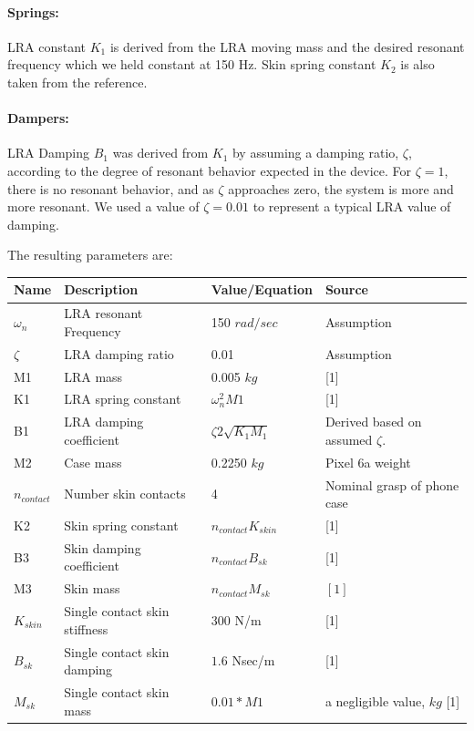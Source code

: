 \documentclass[letterpaper,11pt]{article}
\begin{document}
\paragraph{Springs:}
LRA constant $K_1$ is derived from the LRA moving mass and the desired resonant frequency
which we held constant at 150 Hz.  Skin spring constant
$K_2$ is also  taken from the reference.

\paragraph{Dampers:}
LRA Damping $B_1$ was derived from $K_1$ by assuming a damping ratio, $\zeta$, according to the degree of resonant behavior expected in the device.
For $\zeta=1$, there is no resonant behavior, and as $\zeta$ approaches zero, the system is more and more resonant.  We used a value of $\zeta=0.01$
to represent a typical LRA value of damping.

The resulting parameters are:
\begin{table}[h]
\centering
\begin{tabular}{|l|l|p{1.25in}|p{1.05in}|}\hline

\textbf{Name} & \textbf{Description} & \textbf{Value/Equation} & {\bf Source}\\
\hline
$\omega_n$   &  LRA resonant Frequency &  150  $rad/sec$ & Assumption \\\hline
$\zeta$      &  LRA damping ratio      &   0.01          & Assumption \\\hline
M1 & LRA mass & 0.005 $kg$  & [1]\\
\hline
K1 & LRA spring constant & $\omega_n^2   M1$ & [1]\\
\hline
B1 & LRA damping coefficient & $\zeta   2\sqrt{K_1M_1}$ & Derived based on assumed $\zeta$.\\
\hline
M2 & Case mass & 0.2250 $kg$ & Pixel 6a weight\\
\hline
$n_{contact}$  &  Number skin contacts & 4 & Nominal grasp of phone case \\
\hline
K2 & Skin spring constant & $n_{contact}   K_{skin}$ & [1] \\
\hline
B3 & Skin damping coefficient & $n_{contact}   B_{sk}$ & [1] \\
\hline
M3 & Skin mass & $n_{contact}   M_{sk}$ &  $ [1] $ \\
\hline
$K_{skin}$ & Single contact skin stiffness & 300 N/m & [1] \\
\hline
$B_{sk}$ & Single contact skin damping & $1.6$ Nsec/m & [1]\\
\hline
$M_{sk}$ & Single contact skin mass    & $0.01*M1$    & a negligible value, $kg$ [1] \\
\hline
\end{tabular}
\end{table}
\end{document}
